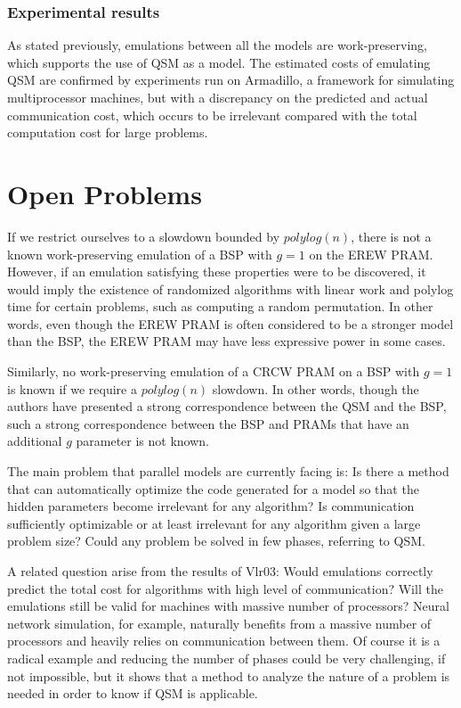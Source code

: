 \documentclass[12pt,a4paper]{article}
\begin{document}
\subsubsection{Experimental results}
As stated previously, emulations between all the models are work-preserving, which supports the use of QSM as a model. The estimated costs 
of emulating QSM are confirmed by experiments run on Armadillo, a framework for simulating multiprocessor machines, but with a discrepancy on 
the predicted and actual communication cost, which occurs to be irrelevant compared with the total computation cost for large problems.

\newpage
\section{Open Problems}

If we restrict ourselves to a slowdown bounded by $polylog(n)$, there is not a known work-preserving emulation of a BSP with $g=1$ on the EREW
PRAM. However, if an emulation satisfying these properties were to be discovered, it would imply the existence of randomized algorithms with
linear work and polylog time for certain problems, such as computing a random permutation. In other words, even though the EREW PRAM is often
considered to be a stronger model than the BSP, the EREW PRAM may have less expressive power in some cases. \cite{Gib99}

Similarly, no work-preserving emulation of a CRCW PRAM on a BSP with $g=1$ is known if we require a $polylog(n)$ slowdown. In other words,
though the authors have presented a strong correspondence between the QSM and the BSP, such a strong correspondence between the BSP and PRAMs
that have an additional $g$ parameter is not known.

The main problem that parallel models are currently facing is: Is there a method that can automatically optimize the code generated for a 
model so that the hidden parameters become irrelevant for any algorithm? Is communication sufficiently optimizable or at least irrelevant for 
any algorithm given a large problem size? Could any problem be solved in few phases, referring to QSM.

A related question arise from the results of {Vlr03}: Would emulations correctly predict the total cost for algorithms with high level of 
communication? Will the emulations still be valid for machines with massive number of processors? Neural network simulation, for example, naturally 
benefits from a massive number of processors and heavily relies on communication between them. Of course it is a radical example and reducing the 
number of phases could be very challenging, if not impossible, but it shows that a method to analyze the nature of a problem is needed in order 
to know if QSM is applicable.
\end{document}
